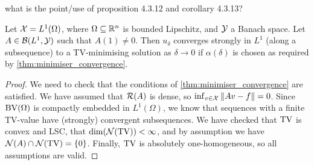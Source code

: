 \TODO what is the point/use of proposition 4.3.12 and corollary 4.3.13? 

\begin{theorem}
	Let $\mathcal X = L^1(\Omega)$, where $\Omega \subseteq \mathbb R^n$ is bounded Lipschitz, and $\mathcal Y$ a Banach space. Let $A \in \mathcal B(L^1, \mathcal Y)$ such that $A(1) \neq 0$. Then $u_\delta$ converges strongly in $L^1$ (along a subsequence) to a TV-minimising solution as $\delta \to 0$ if $\alpha(\delta)$ is chosen as required by \cref{thm:minimiser_convergence}. 
\end{theorem}

\begin{proof}
	We need to check that the conditions of  \cref{thm:minimiser_convergence} are satisfied. We have assumed that $\operatorname{\mathcal R}(A)$ is dense, so $\inf_{v\in \mathcal X} \norm{Av - f} = 0$. Since $\operatorname{BV}(\Omega)$ is compactly embedded in $L^1(\Omega)$, we know that sequences with a finite TV-value have (strongly) convergent subsequences. We have checked that $\operatorname{TV}$ is convex and LSC, that $\dim(\operatorname{\mathcal N}(\operatorname{TV})) < \infty$, and by assumption we have $\operatorname{\mathcal N}(A) \cap \operatorname{\mathcal N}(\operatorname{TV}) = \qty{0}$. Finally, $\operatorname{TV}$ is absolutely one-homogeneous, so all assumptions are valid. 
\end{proof}